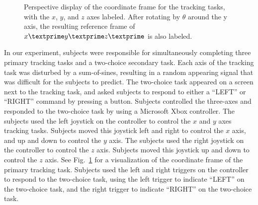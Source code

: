 \begin{figure}[b!]
\begin{center}

        \caption[Perspective display of the coordinate frame for the tracking tasks]{Perspective display of the coordinate frame for the tracking tasks, with the $x$, $y$, and $z$ axes labeled. After rotating by $\theta$ around the y axis, the resulting reference frame of $x\textprime y\textprime z\textprime$ is also labeled.}
        \label{designdiagram}
    \end{center}
\end{figure}

In our experiment, subjects were responsible for simultaneously completing three primary tracking tasks and a two-choice secondary task.
Each axis of the tracking task was disturbed by a sum-of-sines, resulting in a random appearing signal that was difficult for the subjects to predict.
The two-choice task appeared on a screen next to the tracking task, and asked subjects to respond to either a ``LEFT'' or ``RIGHT'' command by pressing a button.
Subjects controlled the three-axes and responded to the two-choice task by using a Microsoft Xbox controller.
The subjects used the left joystick on the controller to control the $x$ and $y$ axes tracking tasks.
Subjects moved this joystick left and right to control the $x$ axis, and up and down to control the $y$ axis.
The subjects used the right joystick on the controller to control the $z$ axis.
Subjects moved this joystick up and down to control the $z$ axis.
See Fig.~\ref{designdiagram} for a visualization of the coordinate frame of the primary tracking task.
Subjects used the left and right triggers on the controller to respond to the two-choice task, using the left trigger to indicate ``LEFT'' on the two-choice task, and the right trigger to indicate ``RIGHT'' on the two-choice task.

